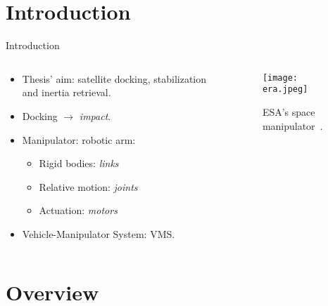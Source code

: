 \makeatletter
\def\beamer@andtitle{\unskip,  }%
\def\beamer@andinst{\\[1pt]}%
\makeatother

\maketitle
\section{Introduction}

\begin{frame}{Introduction}
\begin{columns}
\begin{column}{0.5 \textwidth}
    \begin{itemize}
        \item Thesis' aim: satellite docking, stabilization and inertia retrieval.
        \item Docking $\rightarrow$ \textit{impact}.
        \item Manipulator: robotic arm:
        \begin{itemize}
        \item Rigid bodies: \textit{links}
        \item Relative motion: \textit{joints}
        \item Actuation: \textit{motors}
        \end{itemize}
        \item Vehicle-Manipulator System: VMS.
    \end{itemize}
\end{column}
\begin{column}{0.5 \textwidth}
\begin{figure}
\centering
\texttt{[image: era.jpeg]}
\caption{ESA's space manipulator~\cite{esa}.}
\end{figure}
\end{column}
\end{columns}
\end{frame}

\section{Overview}


